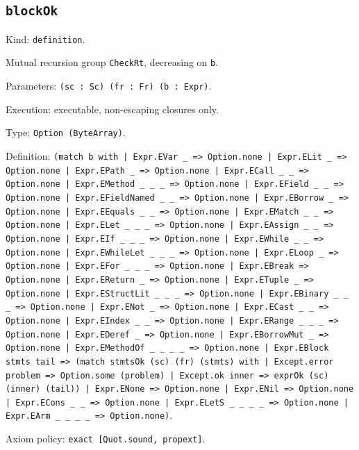 \documentclass[11pt]{article}
\begin{document}
\subsection*{\texttt{blockOk}}
\noindent Kind: \texttt{definition}.\par
\noindent Mutual recursion group \texttt{CheckRt}, decreasing on \texttt{b}.\par
\noindent Parameters: \texttt{(sc : Sc) (fr : Fr) (b : Expr)}.\par
\noindent Execution: executable, non-escaping closures only.\par
\noindent Type: \texttt{Option (ByteArray)}.\par
\noindent Definition: \texttt{(match b with | Expr.EVar \_ => Option.none | Expr.ELit \_ => Option.none | Expr.EPath \_ => Option.none | Expr.ECall \_ \_ => Option.none | Expr.EMethod \_ \_ \_ => Option.none | Expr.EField \_ \_ => Option.none | Expr.EFieldNamed \_ \_ => Option.none | Expr.EBorrow \_ => Option.none | Expr.EEquals \_ \_ => Option.none | Expr.EMatch \_ \_ => Option.none | Expr.ELet \_ \_ \_ => Option.none | Expr.EAssign \_ \_ => Option.none | Expr.EIf \_ \_ \_ => Option.none | Expr.EWhile \_ \_ => Option.none | Expr.EWhileLet \_ \_ \_ => Option.none | Expr.ELoop \_ => Option.none | Expr.EFor \_ \_ \_ => Option.none | Expr.EBreak => Option.none | Expr.EReturn \_ => Option.none | Expr.ETuple \_ => Option.none | Expr.EStructLit \_ \_ \_ => Option.none | Expr.EBinary \_ \_ \_ => Option.none | Expr.ENot \_ => Option.none | Expr.ECast \_ \_ => Option.none | Expr.EIndex \_ \_ => Option.none | Expr.ERange \_ \_ \_ => Option.none | Expr.EDeref \_ => Option.none | Expr.EBorrowMut \_ => Option.none | Expr.EMethodOf \_ \_ \_ \_ => Option.none | Expr.EBlock stmts tail => (match stmtsOk (sc) (fr) (stmts) with | Except.error problem => Option.some (problem) | Except.ok inner => exprOk (sc) (inner) (tail)) | Expr.ENone => Option.none | Expr.ENil => Option.none | Expr.ECons \_ \_ => Option.none | Expr.ELetS \_ \_ \_ \_ => Option.none | Expr.EArm \_ \_ \_ \_ => Option.none)}.\par
\noindent Axiom policy: \texttt{exact [Quot.sound, propext]}.\par
\end{document}
